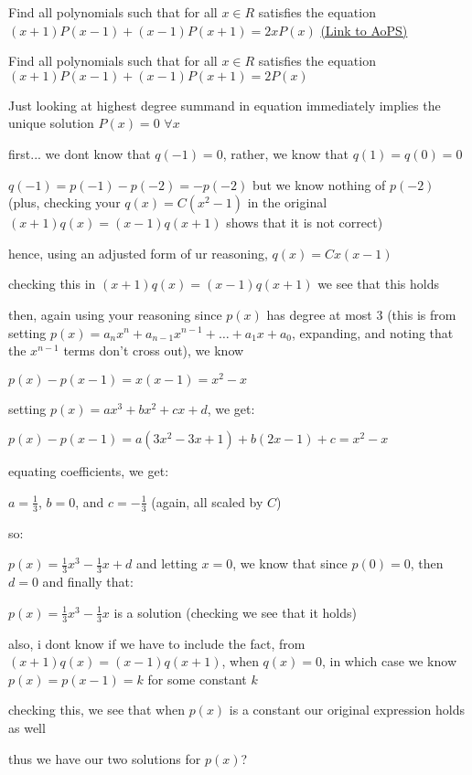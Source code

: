 \begin{problem}
	Find all polynomials such that for all $x \in R$ satisfies the equation
$(x+1)P(x-1)+(x-1)P(x+1)=2xP(x)$
	\flushright \href{https://artofproblemsolving.com/community/c6h482794}{(Link to AoPS)}
\end{problem}



\begin{solution}
	\begin{tcolorbox}Find all polynomials such that for all $x \in R$ satisfies the equation
$(x+1)P(x-1)+(x-1)P(x+1)=2P(x)$\end{tcolorbox}
Just looking at highest degree summand in equation immediately implies the unique solution $P(x)=0$ $\forall x$
\end{solution}



\begin{solution}
	first... we dont know that $q(-1) = 0$, rather, we know that $q(1) = q(0) = 0$

$q(-1) = p(-1) - p(-2) = -p(-2)$ but we know nothing of $p(-2)$ (plus, checking your $q(x) = C(x^2-1)$ in the original $(x+1)q(x) = (x-1)q(x+1)$ shows that it is not correct)

hence, using an adjusted form of ur reasoning, $q(x) = Cx(x-1)$

checking this in $(x+1)q(x) = (x-1)q(x+1)$ we see that this holds

then, again using your reasoning since $p(x)$ has degree at most $3$ (this is from setting $p(x) = a_nx^n + a_{n-1}x^{n-1} + \ldots + a_1x + a_0$, expanding, and noting that the $x^{n-1}$ terms don't cross out), we know

$p(x) - p(x-1) = x(x-1) = x^2-x$

setting $p(x) = ax^3 + bx^2 + cx + d$, we get:

$p(x) - p(x-1) = a(3x^2 - 3x + 1) + b(2x-1) + c = x^2 - x$

equating coefficients, we get:

$a = \frac{1}{3}$, $b = 0$, and $c = - \frac{1}{3}$ (again, all scaled by $C$)

so:

$p(x) = \frac{1}{3}x^3 - \frac{1}{3}x + d$ and letting $x = 0$, we know that since $p(0) = 0$, then $d= 0$ and finally that:

$p(x) = \frac{1}{3}x^3 - \frac{1}{3}x$ is a solution (checking we see that it holds)

also, i dont know if we have to include the fact, from $(x+1)q(x) = (x-1)q(x+1)$, when $q(x) = 0$, in which case we know $p(x) = p(x-1) = k$ for some constant $k$

checking this, we see that when $p(x)$ is a constant our original expression holds as well

thus we have our two solutions for $p(x)$?
\end{solution}



